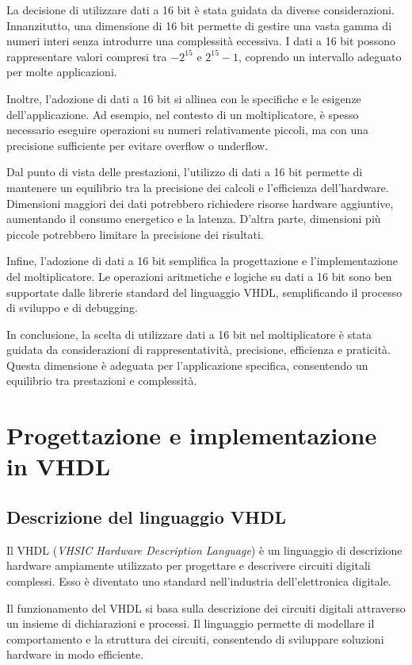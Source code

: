 \documentclass[titlepage]{report}
\begin{document}
			La decisione di utilizzare dati a 16 bit è stata guidata da diverse considerazioni. Innanzitutto, una dimensione di 16 bit permette di gestire una vasta gamma di numeri interi senza introdurre una complessità eccessiva. I dati a 16 bit possono rappresentare valori compresi tra $-2^{15}$ e $2^{15}-1$, coprendo un intervallo adeguato per molte applicazioni.

			Inoltre, l'adozione di dati a 16 bit si allinea con le specifiche e le esigenze dell'applicazione. Ad esempio, nel contesto di un moltiplicatore, è spesso necessario eseguire operazioni su numeri relativamente piccoli, ma con una precisione sufficiente per evitare overflow o underflow.

			Dal punto di vista delle prestazioni, l'utilizzo di dati a 16 bit permette di mantenere un equilibrio tra la precisione dei calcoli e l'efficienza dell'hardware. Dimensioni maggiori dei dati potrebbero richiedere risorse hardware aggiuntive, aumentando il consumo energetico e la latenza. D'altra parte, dimensioni più piccole potrebbero limitare la precisione dei risultati.

			Infine, l'adozione di dati a 16 bit semplifica la progettazione e l'implementazione del moltiplicatore. Le operazioni aritmetiche e logiche su dati a 16 bit sono ben supportate dalle librerie standard del linguaggio VHDL, semplificando il processo di sviluppo e di debugging.

			In conclusione, la scelta di utilizzare dati a 16 bit nel moltiplicatore è stata guidata da considerazioni di rappresentatività, precisione, efficienza e praticità. Questa dimensione è adeguata per l'applicazione specifica, consentendo un equilibrio tra prestazioni e complessità.


\chapter{Progettazione e implementazione in VHDL}
\label{ch:progettazione_vhdl}

	\section{Descrizione del linguaggio VHDL}
	\label{sec:desc_vhdl}
		Il VHDL (\textit{VHSIC Hardware Description Language}) è un linguaggio di descrizione hardware ampiamente utilizzato per progettare e descrivere circuiti digitali complessi. Esso è diventato uno standard nell'industria dell'elettronica digitale.

		Il funzionamento del VHDL si basa sulla descrizione dei circuiti digitali attraverso un insieme di dichiarazioni e processi. Il linguaggio permette di modellare il comportamento e la struttura dei circuiti, consentendo di sviluppare soluzioni hardware in modo efficiente.
\end{document}
